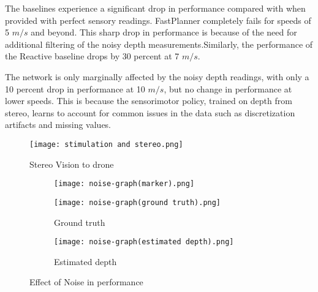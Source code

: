 The baselines experience a significant drop in performance
compared with when provided with perfect sensory readings. FastPlanner \cite{fastPlanner} completely fails for speeds of 5 $m/s$ and beyond. This sharp
drop in performance is because of the need for additional filtering of the noisy depth measurements.Similarly, the performance of the Reactive baseline
drops by 30 percent at 7 $m/s$.

The network is only marginally affected by the noisy depth readings, with only a
10 percent drop in performance at 10 $m/s$, but no change in performance at
lower speeds. This is because the sensorimotor policy, trained on depth from stereo,
learns to account for common issues in the data such as discretization
artifacts and missing values.

\begin{figure}[!h]
	\centering
	\texttt{[image: stimulation and stereo.png]}
	\caption{Stereo Vision to drone}
	\label{fig:sterio-vision}
\end{figure}

\begin{figure}[!h]
	\centering
	\begin{subfigure}[b]{0.75\textwidth}
		\texttt{[image: noise-graph(marker).png]}
	\end{subfigure}
	\begin{subfigure}[b]{0.48\textwidth}
		\texttt{[image: noise-graph(ground truth).png]}
		\caption{Ground truth}
	\end{subfigure}
	\begin{subfigure}[b]{0.48\textwidth}
		\texttt{[image: noise-graph(estimated depth).png]}
		\caption{Estimated depth}
	\end{subfigure}
	\caption{Effect of Noise in performance}
	\label{fig:noise-graph}
\end{figure}